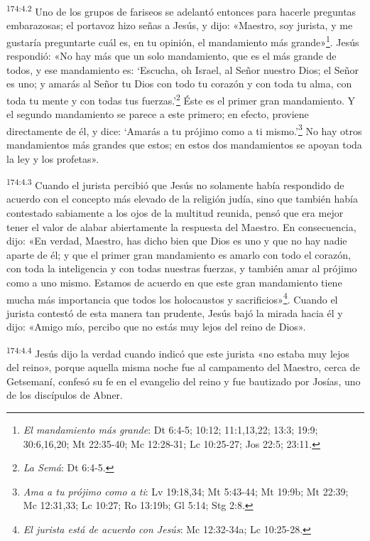 \par
\textsuperscript{174:4.2} Uno de los grupos de fariseos se adelantó entonces para hacerle preguntas embarazosas; el portavoz hizo señas a Jesús, y dijo: «Maestro, soy jurista, y me gustaría preguntarte cuál es, en tu opinión, el mandamiento más grande»\footnote{\textit{El mandamiento más grande}: Dt 6:4-5; 10:12; 11:1,13,22; 13:3; 19:9; 30:6,16,20; Mt 22:35-40; Mc 12:28-31; Lc 10:25-27; Jos 22:5; 23:11.}. Jesús respondió: «No hay más que un solo mandamiento, que es el más grande de todos, y ese mandamiento es: `Escucha, oh Israel, al Señor nuestro Dios; el Señor es uno; y amarás al Señor tu Dios con todo tu corazón y con toda tu alma, con toda tu mente y con todas tus fuerzas.'\footnote{\textit{La Semá}: Dt 6:4-5.} Éste es el primer gran mandamiento. Y el segundo mandamiento se parece a este primero; en efecto, proviene directamente de él, y dice: `Amarás a tu prójimo como a ti mismo.'\footnote{\textit{Ama a tu prójimo como a ti}: Lv 19:18,34; Mt 5:43-44; Mt 19:9b; Mt 22:39; Mc 12:31,33; Lc 10:27; Ro 13:19b; Gl 5:14; Stg 2:8.} No hay otros mandamientos más grandes que estos; en estos dos mandamientos se apoyan toda la ley y los profetas».

\par
\textsuperscript{174:4.3} Cuando el jurista percibió que Jesús no solamente había respondido de acuerdo con el concepto más elevado de la religión judía, sino que también había contestado sabiamente a los ojos de la multitud reunida, pensó que era mejor tener el valor de alabar abiertamente la respuesta del Maestro. En consecuencia, dijo: «En verdad, Maestro, has dicho bien que Dios es uno y que no hay nadie aparte de él; y que el primer gran mandamiento es amarlo con todo el corazón, con toda la inteligencia y con todas nuestras fuerzas, y también amar al prójimo como a uno mismo. Estamos de acuerdo en que este gran mandamiento tiene mucha más importancia que todos los holocaustos y sacrificios»\footnote{\textit{El jurista está de acuerdo con Jesús}: Mc 12:32-34a; Lc 10:25-28.}. Cuando el jurista contestó de esta manera tan prudente, Jesús bajó la mirada hacia él y dijo: «Amigo mío, percibo que no estás muy lejos del reino de Dios».

\par
\textsuperscript{174:4.4} Jesús dijo la verdad cuando indicó que este jurista «no estaba muy lejos del reino», porque aquella misma noche fue al campamento del Maestro, cerca de Getsemaní, confesó su fe en el evangelio del reino y fue bautizado por Josías, uno de los discípulos de Abner.

